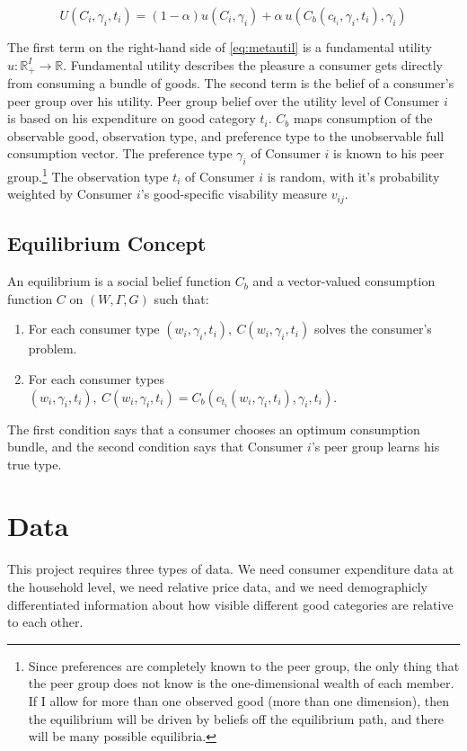 \documentclass[12pt]{article}
\begin{document}
\begin{equation}
    \label{eq:metautil}
    U(C_i,\gamma_i,t_i) = (1-\alpha) u(C_i,\gamma_i) + \alpha\  u(C_b(c_{t_i},\gamma_i,t_i),\gamma_i)
\end{equation}

The first term on the right-hand side of \eqref{eq:metautil} is a fundamental utility $u:\mathbb{R}_+^{I}\rightarrow\mathbb{R}$.  
Fundamental utility describes the pleasure a consumer gets directly from consuming a bundle of goods.
The second term is the belief of a consumer's peer group over his utility.  Peer group belief over the utility level of Consumer $i$ is based on his expenditure on good category $t_i$.  $C_b$ maps consumption of the observable good, observation type, and preference type to the unobservable full consumption vector.  The preference type $\gamma_i$ of Consumer $i$ is known to his peer group.\footnote{Since preferences are completely known to the peer group, the only thing that the peer group does not know is the one-dimensional wealth of each member.  If I allow for more than one observed good (more than one dimension), then the equilibrium will be driven by beliefs off the equilibrium path, and there will be many possible equilibria.}
The observation type $t_i$ of Consumer $i$ is random, with it's probability weighted by Consumer $i$'s good-specific visability measure $v_{ij}$.  

\subsection{Equilibrium Concept}

An equilibrium is a social belief function $C_b$ and a vector-valued consumption function $C$ on $(W,\Gamma,G)$ such that:
\begin{enumerate}
	\item For each consumer type $(w_i,\gamma_i,t_i), \ C(w_i,\gamma_i,t_i)$ solves the consumer's problem.
    \item For each consumer types $(w_i,\gamma_i,t_i), \ C(w_i,\gamma_i,t_i) = C_b(c_{t_i}(w_i,\gamma_i,t_i),\gamma_i,t_i).$
\end{enumerate}
The first condition says that a consumer chooses an optimum consumption bundle, and the second condition says that Consumer $i$'s peer group learns his true type.

\section{Data}
This project requires three types of data.  We need consumer expenditure data at the household level, we need relative price data, and we need demographicly differentiated information about how visible different good categories are relative to each other. 
\end{document}

